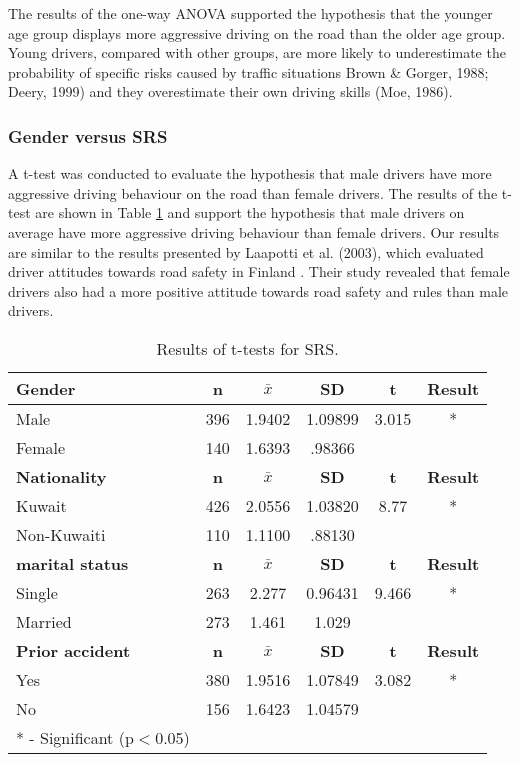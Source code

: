 \documentclass[preprint,12pt,a4paper,authoryear]{elsarticle}
\begin{document}
The results of the one-way ANOVA supported the hypothesis that the younger age group displays more aggressive driving on the road than the older age group. Young drivers, compared with other groups, are more likely to underestimate the probability of specific risks caused by traffic situations Brown \& Gorger, 1988; Deery, 1999) and they overestimate their own driving skills (Moe, 1986).

\subsubsection{Gender versus SRS}

A t-test was conducted to evaluate the hypothesis that male drivers have more aggressive driving behaviour on the road than female drivers.  The results of the t-test are shown in Table \ref{tab:sexdiff} and support the hypothesis that male drivers on average have more aggressive driving behaviour than female drivers. Our results are similar to the results presented by Laapotti et al. (2003), which evaluated driver attitudes towards road safety in Finland \citep{Laapotti2003}. Their study revealed that female drivers also had a more positive attitude towards road safety and rules than male drivers.

\begin{table}[H]
\centering
\caption{Results of t-tests for SRS.}
\label{tab:sexdiff}
\begin{tabular}{@{}lccccc@{}}
\toprule
\textbf{Gender} & \textbf{n} & \textbf{$\bar{x}$} & \textbf{SD} & \textbf{t} & \textbf{Result} \\ \midrule
Male & 396 & 1.9402 & 1.09899 & 3.015 & * \\
Female & 140 & 1.6393 & .98366 &  &  \\ \midrule
\textbf{Nationality} & \textbf{n} & \textbf{$\bar{x}$} & \textbf{SD} & \textbf{t} & \textbf{Result} \\ \midrule
Kuwait & 426 & 2.0556 & 1.03820 & 8.77 & * \\
Non-Kuwaiti & 110 & 1.1100 & .88130 &  &  \\ \midrule
\textbf{marital status} & \textbf{n} & \textbf{$\bar{x}$} & \textbf{SD} & \textbf{t} & \textbf{Result} \\ \midrule
Single & 263 & 2.277 & 0.96431 & 9.466 &* \\
Married & 273 & 1.461 & 1.029 &  &  \\ \midrule
\textbf{Prior accident} & \textbf{n} & \textbf{$\bar{x}$} & \textbf{SD} & \textbf{t} & \textbf{Result} \\ \midrule
Yes & 380 & 1.9516 & 1.07849 & 3.082 & * \\
No & 156 & 1.6423 & 1.04579 &  &  \\ \bottomrule
* - Significant (p$<$0.05) & & & & &  \\
\end{tabular}
\end{table}
\end{document}

